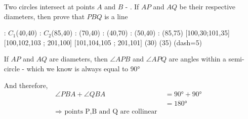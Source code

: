 

\question[2] Two circles intersect at points $A$ and $B$ - \asif. If $AP$ and $AQ$ be their 
respective diameters, then prove that $PBQ$ is a line


  \begin{marginfigure}
    	: $C_1$(40,40)
    	: $C_2$(85,40)
      : (70,40) %
      : (40,70) %
      : (50,40) %
      : (85,75)
       [100,30;101,35] %
       [100,102,103 ; 201,100] %
       [101,104,105 ; 201,101] %
    \figdrawbegin{}
      (30)
      (35)
      \figdrawline [201,301]
      \figdrawline [201,311]
      \figdrawline [301,311]
      \ifprintanswers
        \figset (dash=5)
        \figdrawline [201,200]
      \fi
    \figdrawend
    \centerline{\box\figBoxA}
  \end{marginfigure} 

\begin{solution}[\halfpage]
	If $AP$ and $AQ$ are diameters, then $\angle APB$ and $\angle APQ$ are angles
	within a semi-circle - which we know is always equal to $\ang{90}$
	
	And therefore, 
	\begin{align}
		\angle PBA + \angle QBA &= \ang{90} + \ang{90} \\
		                        &= \ang{180} \\
		     \Rightarrow \text{ points P,B and Q are collinear }
	\end{align}
\end{solution}


